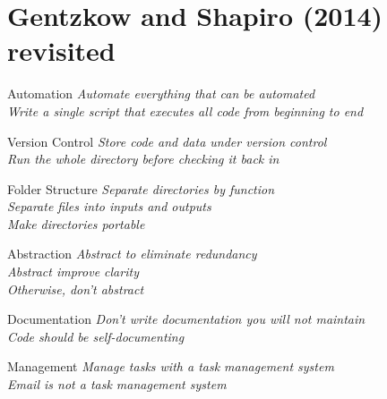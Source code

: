 \documentclass[aspectratio=1610, xcolor={dvipsnames}]{beamer}
\begin{document}
\section{Gentzkow and Shapiro (2014) revisited}

\begin{frame}{Automation}
    \Large
    \textit{Automate everything that can be automated}\\

    \textit{Write a single script that executes all code from beginning to end}\\
\end{frame}
\begin{frame}{Version Control}
    \Large
    \textit{Store code and data under version control}\\

    \textit{Run the whole directory before checking it back in}\\
\end{frame}
\begin{frame}{Folder Structure}
    \Large
    \textit{Separate directories by function}\\

    \textit{Separate files into inputs and outputs}\\

    \textit{Make directories portable}\\
\end{frame}
\begin{frame}{Abstraction}
    \Large
    \textit{Abstract to eliminate redundancy}\\

    \textit{Abstract improve clarity}\\

    \textit{Otherwise, don't abstract}\\
\end{frame}
\begin{frame}{Documentation}
    \Large
    \textit{Don't write documentation you will not maintain}\\

    \textit{Code should be self-documenting}\\
\end{frame}
\begin{frame}{Management}
    \Large
    \textit{Manage tasks with a task management system}\\

    \textit{Email is not a task management system}\\
\end{frame}
\end{document}
